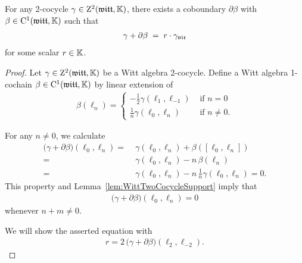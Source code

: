 \begin{lemma}
  \label{lem:WittTwoCocycleNormalization}
  \leanok
  For any 2-cocycle $\gamma \in \mathrm{Z}^2(\mathfrak{witt},\mathbb{K})$, there exists
  a coboundary $\partial \beta$ with $\beta \in \mathrm{C}^1(\mathfrak{witt},\mathbb{K})$
  such that
  \begin{align*}
    \gamma + \partial \beta \; = \; r \cdot {\gamma}_{\mathfrak{vir}}
  \end{align*}
  for some scalar $r \in \mathbb{K}$.
\end{lemma}
\begin{proof}
  \leanok
  Let $\gamma \in \mathrm{Z}^2(\mathfrak{witt},\mathbb{K})$ be a Witt algebra 2-cocycle.
  Define a Witt algebra 1-cochain $\beta \in \mathrm{C}^1(\mathfrak{witt},\mathbb{K})$ by linear extension of
  \begin{align*}
    \beta (\ell_n) =
    \begin{cases}
      -\frac{1}{2} \gamma(\ell_1, \ell_{-1}) & \text{ if } n = 0 \\
      \frac{1}{n} \gamma(\ell_0, \ell_n) & \text{ if } n \ne 0 .
    \end{cases}
  \end{align*}

  For any $n \ne 0$, we calculate
  \begin{align*}
           \big( \gamma + \partial \beta \big) (\ell_0 , \ell_n)
    = \; & \gamma (\ell_0 , \ell_n) + \beta ([\ell_0,\ell_n]) \\
    = \; & \gamma (\ell_0 , \ell_n) - n \, \beta (\ell_n) \\
    = \; & \gamma (\ell_0 , \ell_n) - n \, \frac{1}{n}\gamma(\ell_0, \ell_n) = 0 .
  \end{align*}
  This property and Lemma~\ref{lem:WittTwoCocycleSupport} imply that
  \begin{align*}
    \big( \gamma + \partial \beta \big) (\ell_0 , \ell_n) = 0
  \end{align*}
  whenever $n+m \ne 0$.

  We will show the asserted equation with
  \begin{align*}
    r = 2 \, \big( \gamma + \partial \beta \big) ( \ell_2, \ell_{-2}) .
  \end{align*}


\end{proof}
